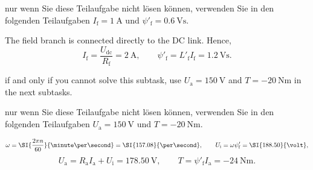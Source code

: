 \begin{germanhintblock}
	nur wenn Sie diese Teilaufgabe nicht lösen können, verwenden Sie in den
	folgenden Teilaufgaben $I_{\mathrm{f}}=\SI{1}{\ampere}$ und
	$\psi'_{\mathrm{f}}=\SI{0.6}{\volt\second}$.
\end{germanhintblock}

\begin{solutionblock}
	The field branch is connected directly to the DC link. Hence,
	\begin{equation*}
		I_{\mathrm{f}}=\frac{U_{\mathrm{dc}}}{R_{\mathrm{f}}}
		=\SI{2}{\ampere},
		\qquad
		\psi'_{\mathrm{f}}=L'_{\mathrm{f}}I_{\mathrm{f}}
		=\SI{1.2}{\volt\second}.
	\end{equation*}
\end{solutionblock}

\begin{hintblock}
	if and only if you cannot solve this subtask, use
	$U_{\mathrm{a}}=\SI{150}{\volt}$ and
	$T=\SI{-20}{\newton\metre}$ in the next subtasks.
\end{hintblock}

\begin{germanhintblock}
	nur wenn Sie diese Teilaufgabe nicht lösen können, verwenden Sie in den
	folgenden Teilaufgaben $U_{\mathrm{a}}=\SI{150}{\volt}$ und $T=\SI{-20}{\newton\metre}$.
\end{germanhintblock}

\begin{solutionblock}
	\begin{equation*}
		\omega=\SI{\frac{2\pi n}{60}}{\minute\per\second}=\SI{157.08}{\per\second},
		\qquad U_{\mathrm{i}}=\omega\psi'_{\mathrm{f}}=\SI{188.50}{\volt},
	\end{equation*}
	\begin{equation*}
		U_{\mathrm{a}}=R_{\mathrm{a}}I_{\mathrm{a}}+U_{\mathrm{i}}
		=\SI{178.50}{\volt},
		\qquad T=\psi'_{\mathrm{f}}I_{\mathrm{a}}=\SI{-24}{\newton\metre}.
	\end{equation*}
\end{solutionblock}

